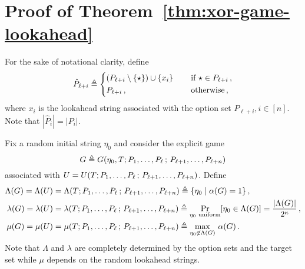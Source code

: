 

\section{Proof of Theorem~\ref{thm:xor-game-lookahead}}


    \newcommand{\Bfull}{b_1, \ldots, b_n}
    \newcommand{\Bless}{b_2, \ldots, b_n}


    For the sake of notational clarity, define 
    \[
        \hat{P}_{\ell + i} \triangleq  
        \begin{dcases}
            (P_{\ell + i} \setminus \{\star\}) \cup \{x_i\}\,
                &\quad\text{if $\star \in P_{\ell + i}$}\,,
            \\
            P_{\ell + i} \,,
                &\quad\text{otherwise}\,,
        \end{dcases}
    \]
    where $x_i$ is the lookahead string associated with the option set $P_{\ell + i}, i \in [n]$. 
    Note that $|\hat{P}_i| = |P_i|$.

    Fix a random initial string $\eta_0$ 
    and consider the explicit game $$G \triangleq G(\eta_0, T;P_1, \ldots, P_\ell\,;\, P_{\ell+1}, \ldots, P_{\ell+n} )$$ 
    associated with $U = U(T;P_1, \ldots, P_\ell\,;\, P_{\ell+1}, \ldots, P_{\ell+n})$. 
    Define
    \begin{align*}
        \Lambda(G) = \Lambda(U) 
            &= \Lambda(T ; P_1, \ldots, P_\ell\,;\, P_{\ell+1}, \ldots, P_{\ell+n}) 
            \triangleq \{ \eta_0 \mid \alpha(G) = 1\}\,,
        \\
        \lambda(G) = \lambda(U) 
            &= \lambda(T; P_1, \ldots, P_\ell\,;\, P_{\ell+1}, \ldots, P_{\ell+n}) 
            \triangleq \Pr_{\text{$\eta_0$ uniform}}[\eta_0 \in \Lambda(G)] 
            = \frac{|\Lambda(G)|}{2^\kappa}\,,
        \\
        \mu(G) = \mu(U)
            &= \mu(T; P_1, \ldots, P_\ell\,;\, P_{\ell+1}, \ldots, P_{\ell+n}) 
            \triangleq \max_{\eta_0 \not\in \Lambda(G)}\, \alpha(G)\,.
    \end{align*}
    Note that $\Lambda$ and $\lambda$ are completely determined by 
    the option sets and the target set 
    while $\mu$ depends on the random lookahead strings.
    
